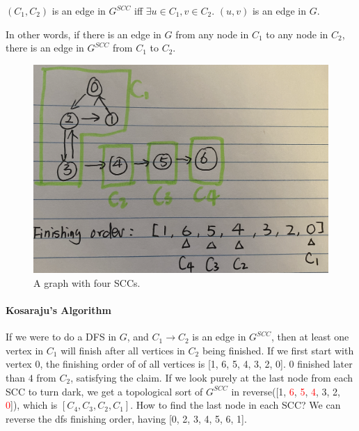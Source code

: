 \documentclass[../main.tex]{subfiles}
\begin{document}
$(C_1, C_2)$ is an edge in $G^{SCC}$ iff $\exists u \in C_1, v \in C_2$. $(u, v)$ is an edge in $G$.

In other words, if there is an edge in $G$
from any node in $C_1$ to any node in $C_2$, there is an edge in $G^{SCC}$ from $C_1$ to $C_2$. 
\begin{figure}[!ht]
    \centering
    \includegraphics[width=0.85\columnwidth] {fig/chapter_advanced_graph/scc.png}
    \caption{A graph with four SCCs.}
    \label{fig:dfs_not_enough}
\end{figure}

\paragraph{Kosaraju's Algorithm} If we were to do a DFS in $G$, and  $C_1\rightarrow C_2$ is an edge in $G^{SCC}$, then at least one vertex in $C_1$ will finish after all vertices in $C_2$ being finished. If we first start with vertex $0$, the finishing order of of all vertices is [1, 6, 5, 4, 3, 2, 0]. $0$ finished later than $4$ from $C_2$, satisfying the claim. If we look purely at the last node from each SCC to turn dark, we get a topological sort of $G^{SCC}$ in reverse([1, \textcolor{red}{6}, \textcolor{red}{5}, \textcolor{red}{4}, 3, 2, \textcolor{red}{0}]), which is $[C_4, C_3, C_2, C_1]$. How to find the last node in each SCC? We can reverse the dfs finishing order, having [0, 2, 3, 4, 5, 6, 1]. 
\end{document}
